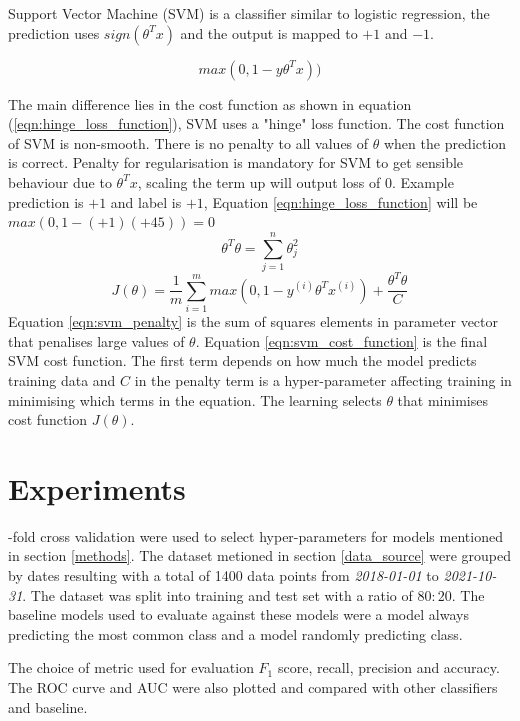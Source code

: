 \documentclass[transmag]{IEEEtran}
\begin{document}
\noindent Support Vector Machine (SVM) is a classifier similar to logistic regression, the prediction uses $sign(\theta^Tx)$ and the output is mapped to $+1$ and $-1$. 

\begin{equation}
\label{eqn:hinge_loss_function}
max(0,1-y\theta^Tx))
\end{equation}

\noindent The main difference lies in the cost function as shown in equation (\ref{eqn:hinge_loss_function}), SVM uses a "hinge" loss function. The cost function of SVM is non-smooth. There is no penalty to all values of $\theta$ when the prediction is correct. Penalty for regularisation is mandatory for SVM to get sensible behaviour due to $\theta^Tx$, scaling the term up will output loss of 0. Example prediction is $+1$ and label is $+1$, Equation \ref{eqn:hinge_loss_function} will be $max(0, 1 - (+1)(+45)) = 0$
\begin{equation}
\label{eqn:svm_penalty}
\theta^T\theta = \sum^n_{j=1} \theta^2_j
\end{equation}
\begin{equation}
\label{eqn:svm_cost_function}
J(\theta) = \frac{1}{m}\sum^m_{i=1}max(0,1-y^{(i)}\theta^Tx^{(i)})+\frac{\theta^T\theta}{C}
\end{equation}
Equation \ref{eqn:svm_penalty} is the sum of squares elements in parameter vector that penalises large values of $\theta$. Equation \ref{eqn:svm_cost_function} is the final SVM cost function. The first term depends on how much the model predicts training data and $C$ in the penalty term is a hyper-parameter affecting training in minimising which terms in the equation. The learning selects $\theta$ that minimises cost function $J(\theta)$.


\section{Experiments}
-fold cross validation were used to select hyper-parameters for models mentioned in section \ref{methods}. The dataset metioned in section \ref{data_source} were grouped by dates resulting with a total of 1400 data points from \emph{2018-01-01} to \emph{2021-10-31}. The dataset was split into training and test set with a ratio of $80:20$. The baseline models used to evaluate against these models were a model always predicting the most common class and a model randomly predicting class.

\label{sec:metric}
\noindent The choice of metric used for evaluation $F_1$ score, recall, precision and accuracy. The ROC curve and AUC were also plotted and compared with other classifiers and baseline.
\end{document}
